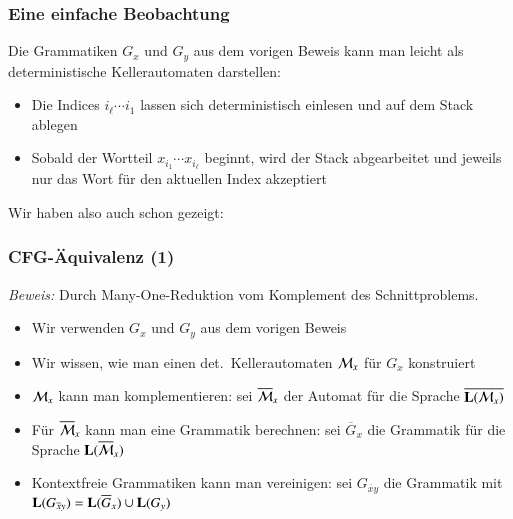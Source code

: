 \documentclass[onlymath]{beamer}
\begin{document}
\begin{frame}\frametitle{Eine einfache Beobachtung}

Die Grammatiken $G_x$ und $G_y$ aus dem vorigen Beweis kann man leicht
als deterministische Kellerautomaten darstellen\pause:
\begin{itemize}
\item Die Indices $i_\ell\cdots i_1$ lassen sich deterministisch einlesen und auf dem Stack ablegen
\item Sobald der Wortteil $x_{i_1}\cdots x_{i_\ell}$ beginnt, wird der Stack abgearbeitet und jeweils nur das Wort für den aktuellen Index akzeptiert
\end{itemize}
\bigskip\pause

Wir haben also auch schon gezeigt:


\end{frame}

\begin{frame}[t]\frametitle{CFG-Äquivalenz (1)}


\emph{Beweis:} Durch Many-One-Reduktion vom Komplement des Schnittproblems.\pause

\begin{itemize}
\item Wir verwenden $G_x$ und $G_y$ aus dem vorigen Beweis\pause
\item Wir wissen, wie man einen det.\ Kellerautomaten $\mathcal{M}_x$ für $G_x$ konstruiert\pause
\item $\mathcal{M}_x$ kann man komplementieren: sei $\overline{\mathcal{M}}_x$ der Automat für
die Sprache $\overline{\textbf{\textcolor{black}{L}}(\mathcal{M}_x)}$\pause
\item Für $\overline{\mathcal{M}}_x$ kann man eine Grammatik berechnen: sei $\overline{G}_x$ die Grammatik für die Sprache $\textbf{\textcolor{black}{L}}(\overline{\mathcal{M}}_x)$\pause
\item Kontextfreie Grammatiken kann man vereinigen: sei $G_{\overline{x}y}$ die Grammatik mit $\textbf{\textcolor{black}{L}}(G_{\overline{x}y})= \textbf{\textcolor{black}{L}}(\overline{G}_x)\cup\textbf{\textcolor{black}{L}}(G_y)$ 
\end{itemize}

\end{frame}
\end{document}
